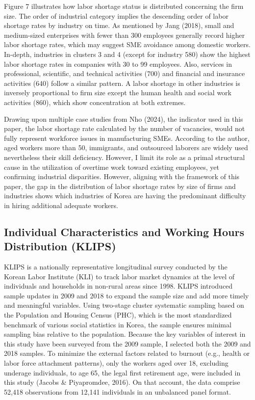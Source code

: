 \documentclass[
  12pt,
]{article}
\begin{document}
Figure 7 illustrates how labor shortage status is distributed concerning
the firm size. The order of industrial category implies the descending
order of labor shortage rates by industry on time. As mentioned by Jang
(2018), small and medium-sized enterprises with fewer than 300 employees
generally record higher labor shortage rates, which may suggest SME
avoidance among domestic workers. In-depth, industries in clusters 3 and
4 (except for industry 580) show the highest labor shortage rates in
companies with 30 to 99 employees. Also, services in professional,
scientific, and technical activities (700) and financial and insurance
activities (640) follow a similar pattern. A labor shortage in other
industries is inversely proportional to firm size except the human
health and social work activities (860), which show concentration at
both extremes.

Drawing upon multiple case studies from Nho (2024), the indicator used
in this paper, the labor shortage rate calculated by the number of
vacancies, would not fully represent workforce issues in manufacturing
SMEs. According to the author, aged workers more than 50, immigrants,
and outsourced laborers are widely used nevertheless their skill
deficiency. However, I limit its role as a primal structural cause in
the utilization of overtime work toward existing employees, yet
confirming industrial disparities. However, aligning with the framework
of this paper, the gap in the distribution of labor shortage rates by
size of firms and industries shows which industries of Korea are having
the predominant difficulty in hiring additional adequate workers.

\subsection{Individual Characteristics and Working Hours Distribution
(KLIPS)}\label{individual-characteristics-and-working-hours-distribution-klips}

KLIPS is a nationally representative longitudinal survey conducted by
the Korean Labor Institute (KLI) to track labor market dynamics at the
level of individuals and households in non-rural areas since 1998. KLIPS
introduced sample updates in 2009 and 2018 to expand the sample size and
add more timely and meaningful variables. Using two-stage cluster
systematic sampling based on the Population and Housing Census (PHC),
which is the most standardized benchmark of various social statistics in
Korea, the sample ensures minimal sampling bias relative to the
population. Because the key variables of interest in this study have
been surveyed from the 2009 sample, I selected both the 2009 and 2018
samples. To minimize the external factors related to burnout (e.g.,
health or labor force attachment patterns), only the workers aged over
18, excluding underage individuals, to age 65, the legal first
retirement age, were included in this study (Jacobs \& Piyapromdee,
2016). On that account, the data comprise 52,418 observations from
12,141 individuals in an unbalanced panel format.
\end{document}
